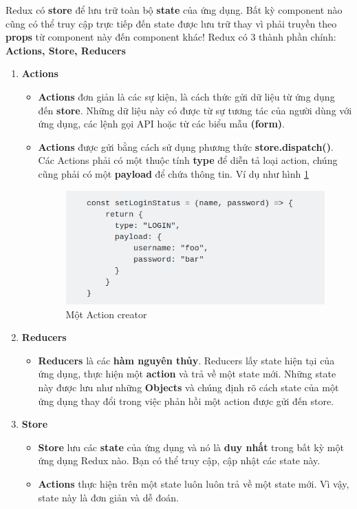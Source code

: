 Redux có \textbf{store} để lưu trữ toàn bộ \textbf{state} của ứng dụng. Bất kỳ component nào cũng có thể truy cập trực tiếp đến state được lưu trữ thay vì phải truyền theo \textbf{props} từ component này đến component khác! Redux có 3 thành phần chính: \textbf{Actions, Store, Reducers}
\begin{enumerate}
    \item \textbf{Actions}
    \begin{itemize}
        \item \textbf{Actions} đơn giản là các sự kiện, là cách thức gửi dữ liệu từ ứng dụng đến \textbf{store}. Những dữ liệu này có được từ sự tương tác của người dùng với ứng dụng, các lệnh gọi API hoặc từ các biểu mẫu \textbf{(form)}.
        \item \textbf{Actions} được gửi bằng cách sử dụng phương thức \textbf{store.dispatch()}. Các Actions phải có một thuộc tính \textbf{type} để diễn tả loại action, chúng cũng phải có một \textbf{payload} để chứa thông tin. Ví dụ như hình \ref{fig:redux-action-creator}
        \begin{figure}[H]
            \centering
            \includegraphics[width=10cm]{image/redux-action-creator.png}
            \caption{Một Action creator}
            \label{fig:redux-action-creator}
        \end{figure}
    \end{itemize}
    \item \textbf{Reducers}
    \begin{itemize}
        \item \textbf{Reducers} là các \textbf{hàm nguyên thủy}. Reducers lấy state hiện tại của ứng dụng, thực hiện một \textbf{action} và trả về một state mới. Những state này được lưu như những \textbf{Objects} và chúng định rõ cách state của một ứng dụng thay đổi trong việc phản hồi một action được gửi đến store.
    \end{itemize}
    \item \textbf{Store}
    \begin{itemize}
        \item \textbf{Store} lưu các \textbf{state} của ứng dụng và nó là \textbf{duy nhất} trong bất kỳ một ứng dụng Redux nào. Bạn có thể truy cập, cập nhật các state này.
        \item \textbf{Actions} thực hiện trên một state luôn luôn trả về một state mới. Vì vậy, state này là đơn giản và dễ đoán.
    \end{itemize}
\end{enumerate}


